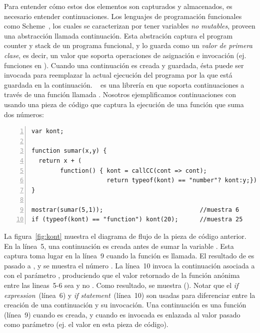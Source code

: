 \documentclass[conference]{IEEEtran}
\begin{document}
Para entender c\'omo estos dos elementos son capturados y almacenados, es necesario entender continuaciones. Los lenguajes de programaci\'on funcionales como Scheme~\cite{scheme48}, los cuales se caracterizan por tener variables {\em no mutables}, proveen una abstracci\'on llamada continuaci\'on. Esta abstraci\'on captura el program counter y stack de un programa funcional, y lo guarda como un {\em valor de primera clase}, es decir, un valor que soporta operaciones de asignaci\'on e invocaci\'on (ej. funciones en \javascript). Cuando una continuaci\'on es creada y guardada, \'esta puede ser invocada para reemplazar la actual ejecuci\'on del programa por la que est\'a guardada en la continuaci\'on. \unwinder~\cite{unwinder:2018} es una librer\'ia en \javascript que soporta continuaciones a trav\'es de una funci\'on llamada . Nosotros ejemplificamos continuaciones con \unwinder usando una pieza de c\'odigo que captura la ejecuci\'on de una funci\'on que suma dos n\'umeros:     



\begin{lstlisting}[linewidth=\columnwidth,numbers=left]
var kont;

function sumar(x,y) {
  return x + (
        function() { kont = callCC(cont => cont);
                     return typeof(kont) == "number"? kont:y;})();
}

mostrar(sumar(5,1));                           //muestra 6
if (typeof(kont) == "function") kont(20);      //muestra 25
\end{lstlisting}

La figura~\ref{fig:kont} muestra el diagrama de flujo de la pieza de c\'odigo anterior. En la l\'inea~5, una continuaci\'on  es creada antes de sumar la variable . Esta captura toma lugar en la l\'inea~9 cuando la funci\'on  es llamada. El resultado de  es pasado a , y se muestra el n\'umero . La l\'inea~10 invoca la continuaci\'on asociada a  con el par\'ametro , produciendo que el valor retornado de la funci\'on an\'onima entre las lineas~5-6 sea  y no . Como resultado, se muestra  (). Notar que el {\em if expression}~(l\'inea~6) y {\em if statement}~(l\'inea~10) son usadas para diferenciar entre la creaci\'on de una continuaci\'on y su invocaci\'on. Una continuaci\'on es una funci\'on (l\'inea~9) cuando es creada, y cuando es invocada es enlazada al valor pasado como par\'ametro (ej. el valor  en esta pieza de c\'odigo).         
\end{document}
